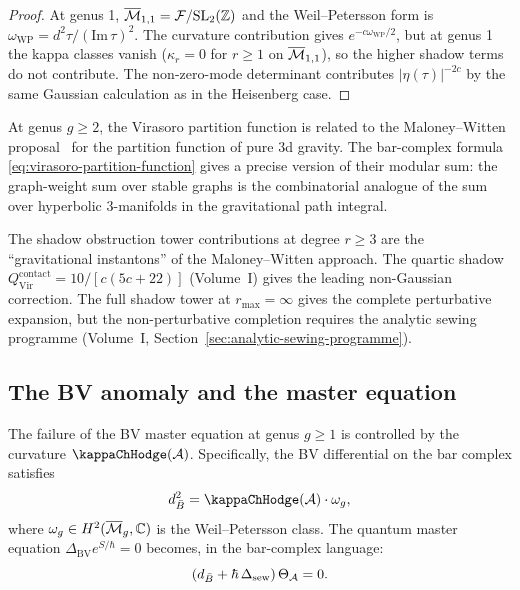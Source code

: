 \begin{proof}
At genus 1, $\overline{\mathcal{M}}_{1,1} = \mathcal{F} / \mathrm{SL}_2(\mathbb{Z})$ and the
Weil--Petersson form is $\omega_{\mathrm{WP}} = d^2\tau / (\mathrm{Im}\,
\tau)^2$. The curvature contribution gives $e^{-c \omega_{\mathrm{WP}}/2}$,
but at genus 1 the kappa classes vanish ($\kappa_r = 0$ for $r \geq 1$
on $\overline{\mathcal{M}}_{1,1}$), so the higher shadow terms do not contribute.
The non-zero-mode determinant contributes $|\eta(\tau)|^{-2c}$ by the
same Gaussian calculation as in the Heisenberg case.
\end{proof}

\begin{remark}
At genus $g \geq 2$, the Virasoro partition function is related to the
Maloney--Witten proposal~\cite{MaloneyWitten} for the partition function
of pure 3d gravity. The bar-complex formula
\eqref{eq:virasoro-partition-function} gives a precise version of their
modular sum: the graph-weight sum over stable graphs is the
combinatorial analogue of the sum over hyperbolic 3-manifolds in the
gravitational path integral.

The shadow obstruction tower contributions at degree $r \geq 3$ are the
``gravitational instantons'' of the Maloney--Witten approach. The
quartic shadow $Q^{\mathrm{contact}}_{\mathrm{Vir}} = 10/[c(5c+22)]$
(Volume~I) gives the leading non-Gaussian correction. The full shadow
tower at $r_{\max} = \infty$ gives the complete perturbative expansion,
but the non-perturbative completion requires the analytic sewing
programme (Volume~I, Section~\ref*{sec:analytic-sewing-programme}).
\end{remark}

\subsection{The BV anomaly and the master equation}

\begin{theorem}
The failure of the BV master equation at genus $g \geq 1$ is controlled
by the curvature $\kappaChHodge(\cA)$. Specifically, the BV differential
on the bar complex satisfies
\[
d_{\barB}^2 = \kappaChHodge(\cA) \cdot \omega_g,
\]
where $\omega_g \in H^2(\overline{\mathcal{M}}_g, \mathbb{C})$ is the Weil--Petersson class.
The quantum master equation $\Delta_{\mathrm{BV}} e^{S/\hbar} = 0$
becomes, in the bar-complex language:
\[
(d_{\bar{B}} + \hbar \, \Delta_{\mathrm{sew}}) \, \Theta_{\mathcal{A}} = 0.
\]
\end{theorem}

